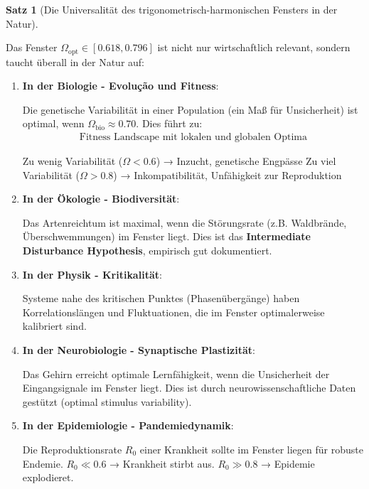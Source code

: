 \documentclass[a4paper,12pt,twoside]{report}
\theoremstyle{definition}
\newtheorem{satz}{Satz}
\begin{document}
\begin{satz}[Die Universalität des trigonometrisch-harmonischen Fensters in der Natur]
\label{satz:universal_resonance}

Das Fenster $\Omega_{\text{opt}} \in [0.618, 0.796]$ ist nicht nur wirtschaftlich relevant, sondern taucht überall in der Natur auf:

\begin{enumerate}
	\item \textbf{In der Biologie - Evolução und Fitness}:
	
	Die genetische Variabilität in einer Population (ein Maß für Unsicherheit) ist optimal, wenn $\Omega_{\text{bio}} \approx 0.70$. Dies führt zu:
	\begin{align}
	\text{Fitness Landscape mit lokalen und globalen Optima}
	\end{align}
	
	Zu wenig Variabilität ($\Omega < 0.6$) → Inzucht, genetische Engpässe
	Zu viel Variabilität ($\Omega > 0.8$) → Inkompatibilität, Unfähigkeit zur Reproduktion
	
	\item \textbf{In der Ökologie - Biodiversität}:
	
	Das Artenreichtum ist maximal, wenn die Störungsrate (z.B. Waldbrände, Überschwemmungen) im Fenster liegt. Dies ist das \textbf{Intermediate Disturbance Hypothesis}, empirisch gut dokumentiert.
	
	\item \textbf{In der Physik - Kritikalität}:
	
	Systeme nahe des kritischen Punktes (Phasenübergänge) haben Korrelationslängen und Fluktuationen, die im Fenster optimalerweise kalibriert sind.
	
	\item \textbf{In der Neurobiologie - Synaptische Plastizität}:
	
	Das Gehirn erreicht optimale Lernfähigkeit, wenn die Unsicherheit der Eingangsignale im Fenster liegt. Dies ist durch neurowissenschaftliche Daten gestützt (optimal stimulus variability).
	
	\item \textbf{In der Epidemiologie - Pandemiedynamik}:
	
	Die Reproduktionsrate $R_0$ einer Krankheit sollte im Fenster liegen für robuste Endemie. $R_0 \ll 0.6$ → Krankheit stirbt aus. $R_0 \gg 0.8$ → Epidemie explodieret.
\end{enumerate}

\end{satz}
\end{document}

